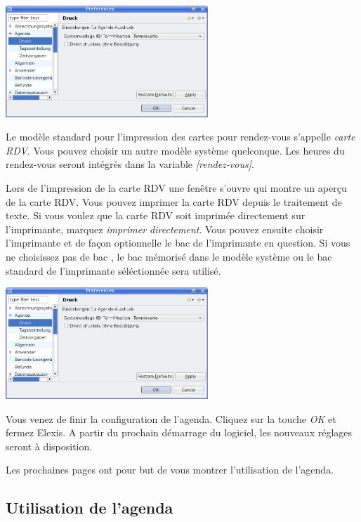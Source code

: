 \includegraphics[width=3in]{images/settings-agenda-druck1.png}

Le modèle standard pour l'impression des cartes pour rendez-vous s'appelle  \textit{carte RDV}. Vous pouvez choisir un autre modèle système quelconque. Les heures du rendez-vous seront intégrés dans la variable
\textit{[rendez-vous]}.

Lors de l'impression de la carte RDV une fenêtre s'ouvre qui montre un aperçu de la carte RDV. Vous pouvez imprimer la carte RDV depuis le traitement de texte.
Si vous voulez que la carte RDV soit imprimée directement sur l'imprimante, marquez
\textit{imprimer directement}. Vous pouvez ensuite choisir l'imprimante et de façon optionnelle le bac de l'imprimante en question. Si vous ne choisissez pas de bac , le bac mémorisé dans le modèle système ou le bac standard de l'imprimante séléctionnée sera utilisé.

\includegraphics[width=3in]{images/settings-agenda-druck1.png}

Vous venez de finir la configuration de l'agenda. Cliquez sur la touche \textit{OK} et fermez Elexis. A partir du prochain démarrage du logiciel, les nouveaux réglages seront à disposition.

Les prochaines pages ont pour but de vous montrer l'utilisation de l'agenda.

\subsection{Utilisation de l'agenda}

